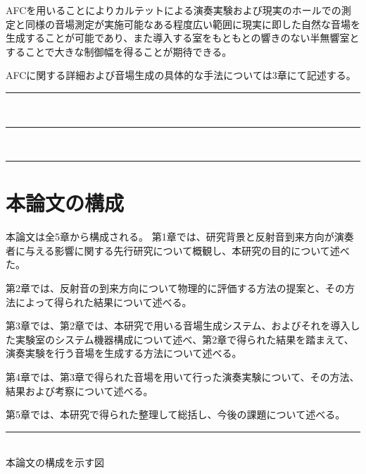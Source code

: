 \documentclass[11pt,a4j]{jreport}
\begin{document}
AFCを用いることによりカルテットによる演奏実験および現実のホールでの測定と同様の音場測定が実施可能なある程度広い範囲に現実に即した自然な音場を生成することが可能であり、また導入する室をもともとの響きのない半無響室とすることで大きな制御幅を得ることが期待できる。

AFCに関する詳細および音場生成の具体的な手法については3章にて記述する。

\lipsum[1-6]
\newpage
\rule{8cm}{6cm}\\
\rule{8cm}{6cm}\\
\rule{8cm}{6cm}

\clearpage
\section{本論文の構成} %
本論文は全5章から構成される。
第1章では、研究背景と反射音到来方向が演奏者に与える影響に関する先行研究について概観し、本研究の目的について述べた。

第2章では、反射音の到来方向について物理的に評価する方法の提案と、その方法によって得られた結果について述べる。

第3章では、第2章では、本研究で用いる音場生成システム、およびそれを導入した実験室のシステム機器構成について述べ、第2章で得られた結果を踏まえて、演奏実験を行う音場を生成する方法について述べる。

第4章では、第3章で得られた音場を用いて行った演奏実験について、その方法、結果および考察について述べる。

第5章では、本研究で得られた整理して総括し、今後の課題について述べる。

\lipsum[1-2]

\newpage
\rule{15cm}{21cm}\\
本論文の構成を示す図

\cleardoublepage


\end{document}
